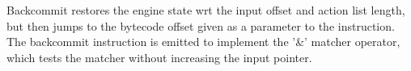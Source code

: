 Backcommit restores the engine state wrt the input offset and
action list length, but then jumps to the bytecode offset given
as a parameter to the instruction. The backcommit instruction
is emitted to implement the '\&' matcher operator, which tests
the matcher without increasing the input pointer.
